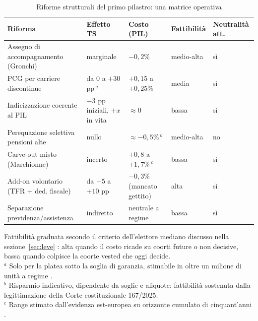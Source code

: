 \begin{table}[h!]
\centering
\small
\renewcommand{\arraystretch}{1.35}
\caption{Riforme strutturali del primo pilastro: una matrice operativa}
\label{tab:matrice}
\begin{tabularx}{\textwidth}{X X p{} p{} p{}}
\toprule
\textbf{Riforma} & \textbf{Effetto TS} & \textbf{Costo (PIL)}
                 & \textbf{Fattibilità} & \textbf{Neutralità att.} \\
\midrule
Assegno di accompagnamento (Gronchi)
   & marginale & $-0,2\%$ & medio-alta & sì \\
\midrule
PCG per carriere discontinue
   & da 0 a $+30$ pp\,$^{a}$ & $+0,15$ a $+0,25\%$ & media & sì \\
\midrule
Indicizzazione coerente al PIL
   & $-3$ pp iniziali, $+x$ in vita & $\approx 0$ & bassa & sì \\
\midrule
Perequazione selettiva pensioni alte
   & nullo & $\approx -0,5\%$\,$^{b}$ & medio-alta & no \\
\midrule
Carve-out misto (Marchionne)
   & incerto & $+0,8$ a $+1,7\%$\,$^{c}$ & bassa & sì \\
\midrule
Add-on volontario (TFR + ded. fiscale)
   & da $+5$ a $+10$ pp & $-0,3\%$ (mancato gettito) & alta & sì \\
\midrule
Separazione previdenza/assistenza
   & indiretto & neutrale a regime & bassa & sì \\
\bottomrule
\end{tabularx}
\par\smallskip
\footnotesize
Fattibilità graduata secondo il criterio dell'elettore mediano discusso nella
sezione~\ref{sec:leve} \citep{Browning1975, GalassoProfeta2002,
SinnUebelmesser2003}: alta quando il costo ricade su coorti future o non
decisive, bassa quando colpisce la coorte vested che oggi decide.\\
$^{a}$ Solo per la platea sotto la soglia di garanzia, stimabile in oltre un
milione di unità a regime \cite{MEF_RGS2025_NdA}.\\
$^{b}$ Risparmio indicativo, dipendente da soglie e aliquote; fattibilità
sostenuta dalla legittimazione della Corte costituzionale 167/2025.\\
$^{c}$ Range stimato dall'evidenza est-europea su orizzonte cumulato di
cinquant'anni \cite{Altiparmakov2022}.
\end{table}

